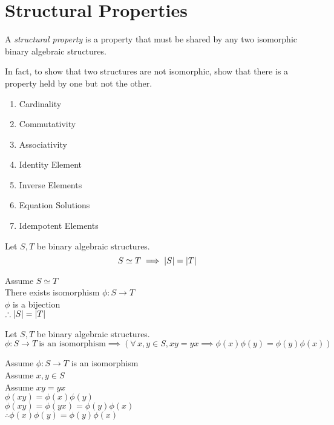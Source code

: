 \documentclass[letterpaper,12pt,fleqn]{article}
\newcommand{\p}{\phi}
\begin{document}
\section*{Structural Properties}

\begin{definition}
  A \emph{structural property} is a property that must be shared by any two
  isomorphic binary algebraic structures.

  In fact, to show that two structures are not isomorphic, show that there is a
  property held by one but not the other.
\end{definition}

\begin{properties}
  \listbreak
  \begin{enumerate}
  \item Cardinality
  \item Commutativity
  \item Associativity
  \item Identity Element
  \item Inverse Elements
  \item Equation Solutions
  \item Idempotent Elements
  \end{enumerate}
\end{properties}

\begin{theorem}
  Let $S,T$ be binary algebraic structures.
  \[S\simeq T\implies\lvert S\rvert=\lvert T\rvert\]
\end{theorem}

\begin{theproof}
  Assume $S\simeq T$ \\
  There exists isomorphism $\p:S\to T$ \\
  $\p$ is a bijection \\
  $\therefore \lvert S\rvert=\lvert T\rvert$
\end{theproof}

\begin{theorem}
  Let $S,T$ be binary algebraic structures.
  \[\p:S\to T\ \mbox{is an isomorphism}\implies
      \left(\forall\,x,y\in S, xy=yx\implies\p(x)\p(y)=\p(y)\p(x)\right)\]
\end{theorem}

\begin{theproof}
  Assume $\p:S\to T$ is an isomorphism \\
  Assume $x,y\in S$ \\
  Assume $xy=yx$ \\
  $\p(xy)=\p(x)\p(y)$ \\
  $\p(xy)=\p(yx)=\p(y)\p(x)$ \\
  $\therefore \p(x)\p(y)=\p(y)\p(x)$
\end{theproof}
\end{document}
